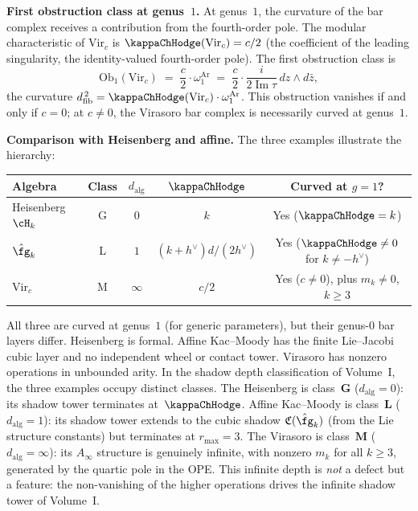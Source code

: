 \begin{example}
\smallskip\noindent
\textbf{First obstruction class at genus~$1$.}
At genus~$1$, the curvature of the bar complex receives a
contribution from the fourth-order pole. The modular
characteristic of $\mathrm{Vir}_c$ is $\kappaChHodge(\mathrm{Vir}_c) = c/2$
(the coefficient of the leading singularity, the identity-valued
fourth-order pole). The first obstruction class is
\begin{equation}\label{eq:virasoro-obstruction}
 \mathrm{Ob}_1(\mathrm{Vir}_c)
 \;=\;
 \frac{c}{2} \cdot \omega_1^{\mathrm{Ar}}
 \;=\;
 \frac{c}{2} \cdot
 \frac{i}{2\operatorname{Im}\tau}\, dz \wedge d\bar z,
\end{equation}
the curvature $\dfib^{\,2} = \kappaChHodge(\mathrm{Vir}_c)\cdot\omega_1^{\mathrm{Ar}}$.
This obstruction vanishes if and only if $c = 0$; at $c \neq 0$,
the Virasoro bar complex is necessarily curved at genus~$1$.

\smallskip\noindent
\textbf{Comparison with Heisenberg and affine.}
The three examples illustrate the hierarchy:
\begin{center}
\renewcommand{\arraystretch}{1.3}
\begin{tabular}{lcccc}
\textbf{Algebra} & \textbf{Class} & $d_{\mathrm{alg}}$ & $\kappaChHodge$ &
 \textbf{Curved at $g=1$?} \\
\hline
Heisenberg $\cH_k$ & G & $0$ & $k$ & Yes ($\kappaChHodge = k$) \\
$\hat\fg_k$ & L & $1$ & $(k+h^\vee)d/(2h^\vee)$ &
 Yes ($\kappaChHodge \neq 0$ for $k \neq -h^\vee$) \\
$\mathrm{Vir}_c$ & M & $\infty$ & $c/2$ & Yes ($c \neq 0$),
 plus $m_k \neq 0$, $k \geq 3$
\end{tabular}
\end{center}
All three are curved at genus~$1$ (for generic parameters), but their
genus-$0$ bar layers differ. Heisenberg is formal. Affine
Kac--Moody has the finite Lie--Jacobi cubic layer and no independent
wheel or contact tower. Virasoro has nonzero operations in
unbounded arity.
In the shadow depth classification of Volume~I,
the three examples occupy distinct classes. The Heisenberg is
class~$\mathbf{G}$ ($d_{\mathrm{alg}} = 0$): its shadow tower
terminates at~$\kappaChHodge$. Affine Kac--Moody is
class~$\mathbf{L}$ ($d_{\mathrm{alg}} = 1$): its shadow tower
extends to the cubic shadow $\mathfrak{C}(\hat\fg_k)$ (from the
Lie structure constants) but terminates at $r_{\max} = 3$.
The Virasoro is class~$\mathbf{M}$
($d_{\mathrm{alg}} = \infty$): its $A_\infty$ structure is genuinely
infinite, with nonzero $m_k$ for all $k \ge 3$, generated by the
quartic pole in the OPE. This infinite depth is \emph{not} a defect
but a feature: the non-vanishing of the higher operations drives the
infinite shadow tower of Volume~I.
\end{example}


